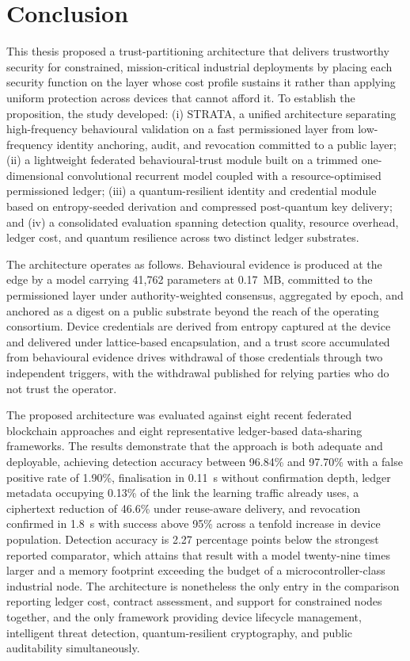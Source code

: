 \Large
\label{Chapter_6}
\section{Conclusion}
\label{sec:conclusion}

This thesis proposed a trust-partitioning architecture that delivers trustworthy security for constrained, mission-critical industrial deployments by placing each security function on the layer whose cost profile sustains it rather than applying uniform protection across devices that cannot afford it. To establish the proposition, the study developed: (i) STRATA, a unified architecture separating high-frequency behavioural validation on a fast permissioned layer from low-frequency identity anchoring, audit, and revocation committed to a public layer; (ii) a lightweight federated behavioural-trust module built on a trimmed one-dimensional convolutional recurrent model coupled with a resource-optimised permissioned ledger; (iii) a quantum-resilient identity and credential module based on entropy-seeded derivation and compressed post-quantum key delivery; and (iv) a consolidated evaluation spanning detection quality, resource overhead, ledger cost, and quantum resilience across two distinct ledger substrates.

The architecture operates as follows. Behavioural evidence is produced at the edge by a model carrying 41{,}762 parameters at 0.17~MB, committed to the permissioned layer under authority-weighted consensus, aggregated by epoch, and anchored as a digest on a public substrate beyond the reach of the operating consortium. Device credentials are derived from entropy captured at the device and delivered under lattice-based encapsulation, and a trust score accumulated from behavioural evidence drives withdrawal of those credentials through two independent triggers, with the withdrawal published for relying parties who do not trust the operator.

The proposed architecture was evaluated against eight recent federated blockchain approaches and eight representative ledger-based data-sharing frameworks. The results demonstrate that the approach is both adequate and deployable, achieving detection accuracy between 96.84\% and 97.70\% with a false positive rate of 1.90\%, finalisation in 0.11~s without confirmation depth, ledger metadata occupying 0.13\% of the link the learning traffic already uses, a ciphertext reduction of 46.6\% under reuse-aware delivery, and revocation confirmed in 1.8~s with success above 95\% across a tenfold increase in device population. Detection accuracy is 2.27 percentage points below the strongest reported comparator, which attains that result with a model twenty-nine times larger and a memory footprint exceeding the budget of a microcontroller-class industrial node. The architecture is nonetheless the only entry in the comparison reporting ledger cost, contract assessment, and support for constrained nodes together, and the only framework providing device lifecycle management, intelligent threat detection, quantum-resilient cryptography, and public auditability simultaneously.

